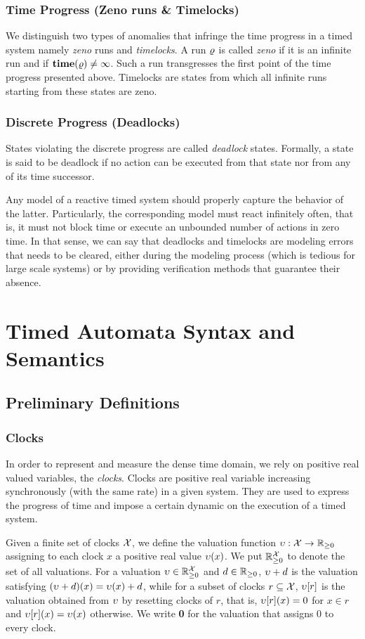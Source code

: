 \subsubsection{Time Progress (Zeno runs \& Timelocks)} 
We distinguish two types of anomalies that infringe the time progress in
a timed system namely \emph{zeno} runs and \emph{timelocks}.
A run $\varrho$ is called \emph{zeno} if it is 
an infinite run and if $\mathbf{time(\varrho)}\neq\infty$. Such a run transgresses the 
first point of the time progress presented above.
Timelocks are states from which all infinite runs starting from these states
are zeno.
\subsubsection{Discrete Progress (Deadlocks)}
States violating the discrete progress are called \emph{deadlock} states.
Formally, a state is said to be deadlock if no action can be executed from 
that state nor from any of its time successor. 

Any model of a reactive timed system should properly capture the behavior 
of the latter. Particularly, the corresponding model must react infinitely often,
that is, it must not block time or execute an unbounded number of actions in zero 
time. In that sense, we can say that deadlocks and timelocks are modeling errors
that needs to be cleared, either during the modeling process (which is tedious 
for large scale systems) or by providing verification methods that guarantee
their absence. 


\section{Timed Automata Syntax and Semantics}\label{sec:2.2}
\subsection{Preliminary Definitions}
\subsubsection{Clocks}
In order to represent and measure the dense time domain, we rely on positive 
real valued variables, the \emph{clocks}. Clocks are 
positive real variable increasing synchronously (with the same rate) in a 
given system. They are used to express the progress of time and impose 
a certain dynamic on the execution of a timed system.

Given a finite set of clocks $\mathcal{X}$, we define the valuation function
$\upsilon:\mathcal{X}\to\mathbb{R}_{\ge 0}$ assigning to each clock $x$ a positive real value 
$\upsilon(x)$. We put $\mathbb{R}_{\ge 0}^{\mathcal{X}}$ to denote the set of all valuations.
For a valuation $\upsilon\in\mathbb{R}_{\ge 0}^{\mathcal{X}}$ and $d\in\mathbb{R}_{\ge 0}$, $\upsilon+d$ is the valuation
satisfying $(\upsilon+d)(x)=\upsilon(x)+d$, while for a subset of clocks 
$r\subseteq\mathcal{X}$, $\upsilon[r]$ is the valuation obtained from $\upsilon$ by 
resetting clocks of $r$, that is, $\upsilon[r](x)=0$ for $x\in r$ and
$\upsilon[r](x)=\upsilon(x)$ otherwise. We write {\bf 0} for the valuation 
that assigns 0 to every clock.

